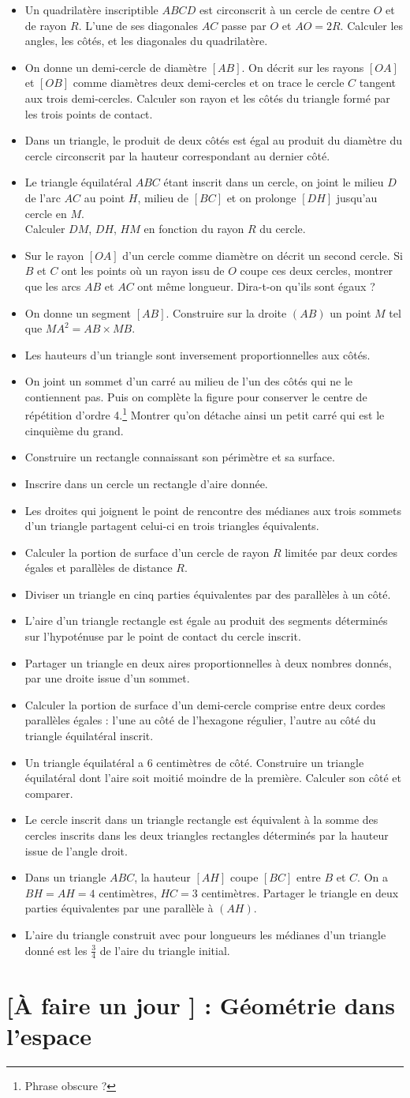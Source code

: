 \documentclass[12 pt]{report}
\theoremstyle{plain}
\newcounter{n}
\renewcommand{\it}{\item[$\mathbf{\then}.$]\stepcounter{n} }
\begin{document}
\begin{itemize}
\it Un quadrilatère inscriptible $ABCD$ est circonscrit à un cercle de centre $O$ et de rayon $R$. L'une de ses diagonales $AC$ passe par $O$ et $AO=2R$. Calculer les angles, les côtés, et les diagonales du quadrilatère. 
\it On donne un demi-cercle de diamètre $[AB]$. On décrit sur les rayons $[OA]$ et $[OB]$ comme diamètres deux demi-cercles et on trace le cercle $C$ tangent aux trois demi-cercles. Calculer son rayon et les côtés du triangle formé par les trois points de contact. 
\it Dans un triangle, le produit de deux côtés est égal au produit du diamètre du cercle circonscrit par la hauteur correspondant au dernier côté. 
\it Le triangle équilatéral $ABC$ étant inscrit dans un cercle, on joint le milieu $D$ de l'arc $AC$ au point $H$, milieu de $[BC]$ et on prolonge $[DH]$ jusqu'au cercle en $M$. \\ Calculer $DM$, $DH$, $HM$ en
fonction du rayon $R$ du cercle. 
\it Sur le rayon $[OA]$ d'un cercle comme diamètre on décrit un second
cercle. Si $B$ et $C$ ont les points où un rayon issu de $O$ coupe ces deux cercles, montrer que les arcs $AB$ et $AC$ ont même longueur. Dira-t-on qu'ils sont égaux ? 
\it On donne un segment $[AB]$. Construire sur la droite $(AB)$ un point $M$ tel que $MA^2=AB\times MB$. 
\it Les hauteurs d'un triangle sont inversement proportionnelles aux côtés. 
\it On joint un sommet d'un carré au milieu de l'un des côtés qui ne le contiennent pas. Puis on complète la figure pour conserver le centre de répétition d'ordre 4.\footnote{Phrase obscure ?} Montrer qu'on détache ainsi un petit carré qui est le cinquième du grand. 
\it Construire un rectangle connaissant son périmètre et sa surface. 
\it Inscrire dans un cercle un rectangle d'aire donnée. 
\it Les droites qui joignent le point de rencontre des médianes aux trois sommets d'un triangle partagent celui-ci en trois triangles équivalents. 
\it Calculer la portion de surface d'un cercle de rayon $R$ limitée par 
deux cordes égales et parallèles de distance $R$. 
\it Diviser un triangle en cinq parties équivalentes par des parallèles à un côté.
\it L'aire d'un triangle rectangle est égale au produit des segments déterminés sur l'hypoténuse par le point de contact du cercle inscrit.
\it Partager un triangle en deux aires proportionnelles à deux nombres donnés, par une droite issue d'un sommet. 
\it Calculer la portion de surface d'un demi-cercle comprise entre deux cordes parallèles égales : l'une au côté de l'hexagone régulier, l'autre au côté du triangle équilatéral inscrit. 
\it Un triangle équilatéral a $6$ centimètres de côté. Construire un triangle équilatéral dont l'aire soit moitié moindre de la première. Calculer son côté et comparer. 
\it Le cercle inscrit dans un triangle rectangle est équivalent à la somme des cercles inscrits dans les deux triangles rectangles déterminés par la hauteur issue de l'angle droit. 
\it Dans un triangle $ABC$, la hauteur $[AH]$ coupe $[BC]$ entre $B$ et $C$. On a $BH=AH= 4$ centimètres, $HC= 3$ centimètres. Partager le triangle en deux parties équivalentes par une parallèle à $(AH)$. 
\it L'aire du triangle construit avec pour longueurs les médianes d'un triangle donné est les $\frac34$ de l'aire du triangle initial.
\end{itemize}

\part{[À faire un jour ] : Géométrie dans l'espace}
 	
\end{document}
